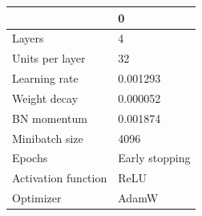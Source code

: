 \begin{tabular}{ll}
\toprule
 & 0 \\
\midrule
Layers & 4 \\
Units per layer & 32 \\
Learning rate & 0.001293 \\
Weight decay & 0.000052 \\
BN momentum & 0.001874 \\
Minibatch size & 4096 \\
Epochs & Early stopping \\
Activation function & ReLU \\
Optimizer & AdamW \\
\bottomrule
\end{tabular}
